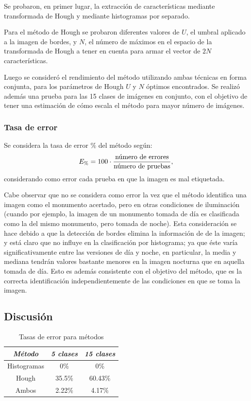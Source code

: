 \documentclass[conference,spanish,a4paper,10pt,oneside,final]{tfmpd}
\begin{document}
Se probaron, en primer lugar, la extracción de características mediante
transformada de Hough y mediante histogramas por separado.

Para el método de Hough se probaron diferentes valores de $U$, el umbral
aplicado a la imagen de bordes, y $N$, el número de máximos en el espacio de
la transformada de Hough a tener en cuenta para armar el vector de $2N$
características.

Luego se consideró el rendimiento del método utilizando ambas técnicas en
forma conjunta, para los parámetros de Hough $U$ y $N$ óptimos encontrados.
Se realizó además una prueba para las 15 clases de imágenes en conjunto,
con el objetivo de tener una estimación de cómo escala el método para
mayor número de imágenes.

\subsubsection*{Tasa de error}
Se considera la tasa de error $\%$ del método según:
\begin{equation}
E_\%=100\cdot\frac{\textrm{número de errores}}{\textrm{número de pruebas}},
\end{equation}
considerando como error cada prueba en que la imagen es mal etiquetada.

Cabe observar que no se considera como error la vez que el método identifica
una imagen como el monumento acertado, pero en otras
condiciones de iluminación (cuando por ejemplo, la imagen de un monumento
tomada de día es clasificada como la del mismo monumento, pero tomada de noche).
Esta consideración se hace debido a que la detección de bordes elimina la
información de   de la imagen; y está claro que no influye
en la clasificación por histograma; ya que éste varía significativamente
entre las versiones de día y noche, en particular, la media y mediana tendrán
valores bastante menores en la imagen nocturna que en aquella tomada de día.
Esto es además consistente con el objetivo del método, que es la correcta
identificación independientemente de las condiciones en que se toma la imagen.

%
%
%
%
\subsection{Discusión}
\begin{table}
\caption{Tasas de error para métodos}
\begin{center}
\begin{tabular}{ccc}
\hline \emph{Método} & \emph{5 clases} & \emph{15 clases}\\ 
\hline Histogramas & 0\% & 0\%\\ 
\hline Hough & 35.5\% & 60.43\%\\ 
\hline Ambos & 2.22\% & 4.17\%\\ 
\hline 
\end{tabular} 
\end{center}
\label{tablaerrores}
\end{table}
\end{document}
